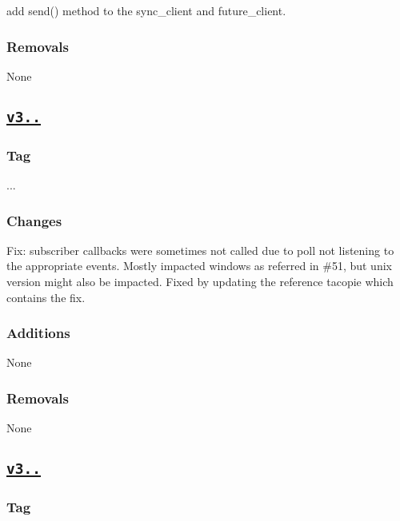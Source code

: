 \begin{DoxyItemize}
\item add {\ttfamily send()} method to the {\ttfamily sync\+\_\+client} and {\ttfamily future\+\_\+client}. \subsubsection*{Removals}
\end{DoxyItemize}

None

\subsection*{\href{https://github.com/Cylix/cpp_redis/releases/tag/3.1.1}{\tt v3..}}

\subsubsection*{Tag}

{..}. \subsubsection*{Changes}


\begin{DoxyItemize}
\item Fix\+: subscriber callbacks were sometimes not called due to poll not listening to the appropriate events. Mostly impacted windows as referred in \#51, but unix version might also be impacted. Fixed by updating the reference tacopie which contains the fix. \subsubsection*{Additions}
\end{DoxyItemize}

None \subsubsection*{Removals}

None

\subsection*{\href{https://github.com/Cylix/cpp_redis/releases/tag/3.1.0}{\tt v3..}}

\subsubsection*{Tag}

